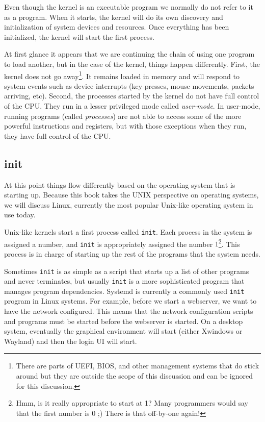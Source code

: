 \documentclass{article}
\begin{document}
Even though the kernel is an executable program we normally do not refer to it as a program.
When it starts, the kernel will do its own discovery and initialization of system devices and resources.
Once everything has been initialized, the kernel will start the first process.

At first glance it appears that we are continuing the chain of using one program to load another, but in the case of the kernel, things happen differently.
First, the kernel does not go away\footnote{There are parts of UEFI, BIOS, and other management systems that do stick around but they are outside the scope of this discussion and can be ignored for this discussion.}.
It remains loaded in memory and will respond to system events such as device interrupts (key presses, mouse movements, packets arriving, etc).
Second, the processes started by the kernel do not have full control of the CPU.
They run in a lesser privileged mode called \emph{user-mode}.
In user-mode, running programs (called \emph{processes}) are not able to access some of the more powerful instructions and registers, but with those exceptions when they run, they have full control of the CPU.

\subsection{init}

At this point things flow differently based on the operating system that is starting up.
Because this book takes the UNIX perspective on operating systems, we will discuss Linux, currently the most popular Unix-like operating system in use today.

Unix-like kernels start a first process called \texttt{init}.
Each process in the system is assigned a number, and \texttt{init} is appropriately assigned the number $1$\footnote{Hmm, is it really appropriate to start at 1? Many programmers would say that the first number is 0 ;) There is that off-by-one again!}.
This process is in charge of starting up the rest of the programs that the system needs.

Sometimes \texttt{init} is as simple as a script that starts up a list of other programs and never terminates, but usually \texttt{init} is a more sophisticated program that manages program dependencies.
Systemd is currently a commonly used \texttt{init} program in Linux systems.
For example, before we start a webserver, we want to have the network configured.
This means that the network configuration scripts and programs must be started before the webserver is started.
On a desktop system, eventually the graphical environment will start (either Xwindows or Wayland) and then the login UI will start.
\end{document}
